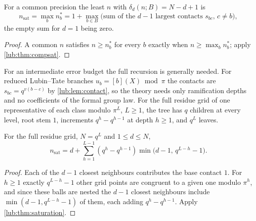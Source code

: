 \begin{corollary}\label{lub:thm:saturation}
For a common precision the least $n$ with $\delta_d(n;B)=N-d+1$ is
\[
 n_{\mathrm{sat}}=\max_bn_b^*=1+\max_{b\in B}\bigl(\text{sum of the $d-1$ largest contacts $s_{bc}$, $c\ne b$}\bigr),
\]
the empty sum for $d=1$ being zero.
\end{corollary}

\begin{proof}
A common $n$ satisfies $n\ge n_b^*$ for every $b$ exactly when $n\ge\max_bn_b^*$; apply \cref{lub:thm:compsat}.
\end{proof}

For an intermediate error budget the full recursion is generally needed. For reduced
Lubin--Tate branches $u_b=[b](X)\bmod\pi$ the contacts are $s_{bc}=q^{v(b-c)}$ by
\cref{lub:lem:contact}, so the theory needs only ramification depths and no coefficients
of the formal group law. For the full residue grid of one representative of each class
modulo $\pi^L$, $L\ge1$, the tree has $q$ children at every level, root stem $1$, increments
$q^h-q^{h-1}$ at depth $h\ge1$, and $q^L$ leaves.

\begin{corollary}\label{lub:cor:grid}
For the full residue grid, $N=q^L$ and $1\le d\le N$,
\[
 n_{\mathrm{sat}}=d+\sum_{h=1}^{L-1}(q^h-q^{h-1})\min\bigl(d-1,\,q^{L-h}-1\bigr).
\]
\end{corollary}

\begin{proof}
Each of the $d-1$ closest neighbours contributes the base contact $1$. For $h\ge1$ exactly
$q^{L-h}-1$ other grid points are congruent to a given one modulo $\pi^h$, and since these
balls are nested the $d-1$ closest neighbours include $\min(d-1,q^{L-h}-1)$ of them, each
adding $q^h-q^{h-1}$. Apply \cref{lub:thm:saturation}.
\end{proof}


